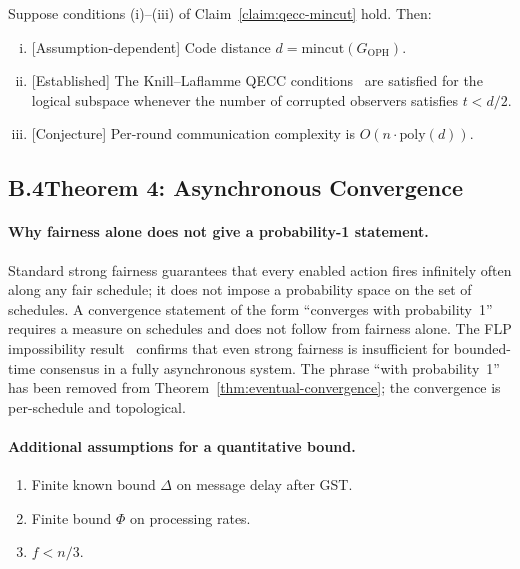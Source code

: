 \begin{theorem}
\label{thm:qecc}
Suppose conditions (i)--(iii) of Claim~\ref{claim:qecc-mincut} hold.
Then:
\begin{enumerate}[(i)]
  \item \textrm{[Assumption-dependent]} Code distance $d =
        \mathrm{mincut}(G_{\mathrm{OPH}})$.
  \item \textrm{[Established]} The Knill--Laflamme \textrm{QECC}
        conditions~\cite{KL97} are satisfied for the logical subspace
        whenever the number of corrupted observers satisfies $t<d/2$.
  \item \textrm{[Conjecture]} Per-round communication complexity is
        $O(n\cdot\mathrm{poly}(d))$.
\end{enumerate}
\end{theorem}

\subsection*{B.4\quad Theorem 4: Asynchronous Convergence}

\paragraph{Why fairness alone does not give a probability-1 statement.}
Standard strong fairness guarantees that every enabled action fires
infinitely often along any fair schedule; it does not impose a probability
space on the set of schedules.
A convergence statement of the form ``converges with probability~1''
requires a measure on schedules and does not follow from fairness alone.
The \textrm{FLP} impossibility result~\cite{FLP85} confirms that even
strong fairness is insufficient for bounded-time consensus in a fully
asynchronous system.
The phrase ``with probability~1'' has been removed from
Theorem~\ref{thm:eventual-convergence}; the convergence is per-schedule
and topological.

\paragraph{Additional assumptions for a quantitative bound.}
\begin{enumerate}[(B1)]
  \item Finite known bound $\Delta$ on message delay after \textrm{GST}.
  \item Finite bound $\Phi$ on processing rates.
  \item $f < n/3$.
\end{enumerate}

